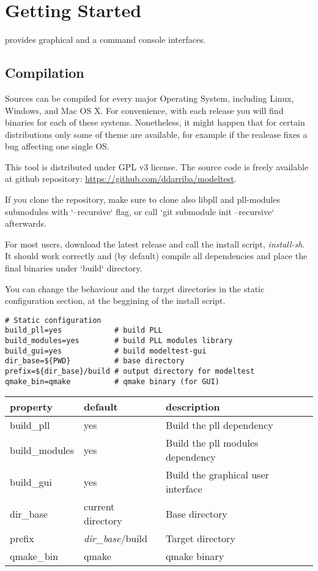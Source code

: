 \section{Getting Started}

\modeltest provides graphical and a command console interfaces.

\subsection{Compilation}

Sources can be compiled for every major Operating System, including Linux, Windows, and Mac OS X. For convenience, with each release you will find binaries for each of these systems.
Nonetheless, it might happen that for certain distributions only some of theme are available, for example if the realease fixes a bug affecting one single OS.

This tool is distributed under GPL v3 license. 
The source code is freely available at github repository: \url{https://github.com/ddarriba/modeltest}.

If you clone the repository, make sure to clone also libpll and pll-modules submodules with `--recursive` flag, or call `git submodule init --recursive` afterwards.

For most users, download the latest release and call the install script, {\em install-sh}. 
It should work correctly and (by default) compile all dependencies and place the final binaries under `build` directory.

You can change the behaviour and the target directories in the static configuration section, at the beggining of the install script.

\begin{lstlisting}
# Static configuration                                                          
build_pll=yes            # build PLL                                            
build_modules=yes        # build PLL modules library                            
build_gui=yes            # build modeltest-gui                                  
dir_base=${PWD}          # base directory                                       
prefix=${dir_base}/build # output directory for modeltest                       
qmake_bin=qmake          # qmake binary (for GUI)
\end{lstlisting}

\begin{tabular}{lll}
  {\bf property} & {\bf default} & {\bf description} \\
  \hline
  build\_pll & yes & Build the pll dependency \\
  build\_modules & yes & Build the pll modules dependency \\
  build\_gui & yes & Build the graphical user interface \\
  dir\_base & current directory & Base directory \\
  prefix & {\em dir\_base}/build & Target directory \\
  qmake\_bin & qmake & qmake binary \\
\end{tabular}

